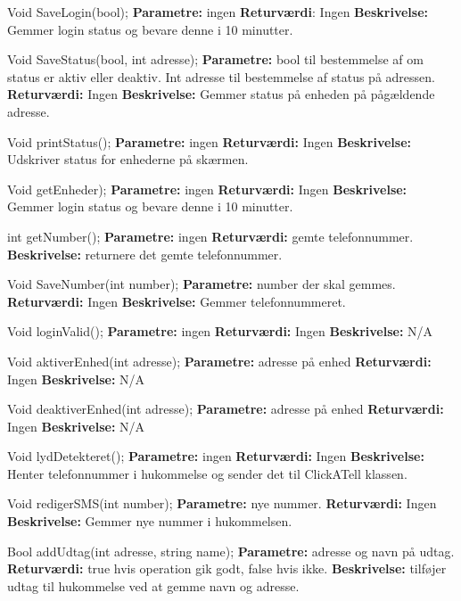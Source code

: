 
Void SaveLogin(bool);
\textbf{Parametre:} ingen 
\textbf{Returværdi}: Ingen
\textbf{Beskrivelse:} Gemmer login status og bevare denne i 10 minutter.

Void SaveStatus(bool, int adresse);
\textbf{Parametre:} bool til bestemmelse af om status er aktiv eller deaktiv. Int adresse til bestemmelse af status på adressen.
\textbf{Returværdi:} Ingen
\textbf{Beskrivelse:} Gemmer status på enheden på pågældende adresse.

Void printStatus();
\textbf{Parametre:} ingen 
\textbf{Returværdi:} Ingen
\textbf{Beskrivelse:} Udskriver status for enhederne på skærmen.

Void getEnheder);
\textbf{Parametre:} ingen 
\textbf{Returværdi:} Ingen
\textbf{Beskrivelse:} Gemmer login status og bevare denne i 10 minutter.

int getNumber();
\textbf{Parametre:} ingen 
\textbf{Returværdi:} gemte telefonnummer.
\textbf{Beskrivelse:} returnere det gemte telefonnummer.

Void SaveNumber(int number);
\textbf{Parametre:} number der skal gemmes.
\textbf{Returværdi:} Ingen
\textbf{Beskrivelse:} Gemmer telefonnummeret.


Void loginValid();
\textbf{Parametre:} ingen 
\textbf{Returværdi:} Ingen
\textbf{Beskrivelse:} N/A


Void aktiverEnhed(int adresse);
\textbf{Parametre:} adresse på enhed 
\textbf{Returværdi:} Ingen
\textbf{Beskrivelse:} N/A



Void deaktiverEnhed(int adresse);
\textbf{Parametre:} adresse på enhed
\textbf{Returværdi:} Ingen
\textbf{Beskrivelse:} N/A


Void lydDetekteret();
\textbf{Parametre:} ingen 
\textbf{Returværdi:} Ingen
\textbf{Beskrivelse:} Henter telefonnummer i hukommelse og sender det til ClickATell klassen.


Void redigerSMS(int number);
\textbf{Parametre:} nye nummer.
\textbf{Returværdi:} Ingen
\textbf{Beskrivelse:} Gemmer nye nummer i hukommelsen.


Bool addUdtag(int adresse, string name);
\textbf{Parametre:} adresse og navn på udtag.
\textbf{Returværdi:} true hvis operation gik godt, false hvis ikke.
\textbf{Beskrivelse:} tilføjer udtag til hukommelse ved at gemme navn og adresse.

